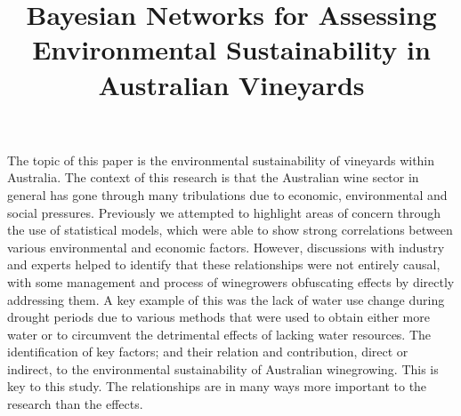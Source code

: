 
\usepackage{graphicx}


The topic of this paper is the environmental sustainability of vineyards within Australia.
The context of this research is that the Australian wine sector in general has gone through many tribulations due to economic, environmental and social pressures. Previously we attempted to highlight areas of concern through the use of statistical models, which were able to show strong correlations between various environmental and economic factors. However, discussions with industry and experts helped to identify that these relationships were not entirely causal, with some management and process of winegrowers obfuscating effects by directly addressing them. A key example of this was the lack of water use change during drought periods due to various methods that were used to obtain either more water or to circumvent the detrimental effects of lacking water resources.
The identification of key factors; and their relation and contribution, direct or indirect, to the environmental sustainability of Australian winegrowing.
This is key to this study. The relationships are in many ways more important to the research than the effects.

%
\title{Bayesian Networks for Assessing Environmental Sustainability in Australian Vineyards}







%

